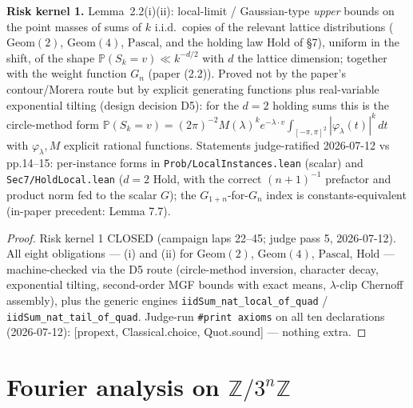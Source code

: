 \begin{lemma}\label{S3}
  \leanok
\textbf{Risk kernel 1.}  Lemma~2.2(i)(ii): local-limit / Gaussian-type \emph{upper} bounds on
the point masses of sums of \(k\) i.i.d.\ copies of the relevant lattice distributions
(\(\mathrm{Geom}(2)\), \(\mathrm{Geom}(4)\), \(\mathrm{Pascal}\), and the holding law
\(\mathrm{Hold}\) of §7), uniform in the shift, of the shape
\(\mathbb{P}(S_k = v)\ll k^{-d/2}\) with \(d\) the lattice dimension; together with the weight
function \(G_n\) (paper (2.2)).  Proved not by the paper's contour/Morera route but by explicit
generating functions plus real-variable exponential tilting (design decision D5): for the
\(d=2\) holding sums this is the circle-method form
\(\mathbb{P}(S_k=v)=(2\pi)^{-2}M(\lambda)^k e^{-\lambda\cdot v}\int_{[-\pi,\pi]^2}
|\varphi_\lambda(t)|^k\,dt\) with \(\varphi_\lambda,M\) explicit rational functions.
Statements judge-ratified 2026-07-12 vs pp.14--15: per-instance forms in
\texttt{Prob/LocalInstances.lean} (scalar) and \texttt{Sec7/HoldLocal.lean} (\(d=2\) Hold,
with the correct \((n+1)^{-1}\) prefactor and product norm fed to the scalar \(G\)); the
\(G_{1+n}\)-for-\(G_n\) index is constants-equivalent (in-paper precedent: Lemma 7.7).
\end{lemma}
\begin{proof}
  \leanok
Risk kernel 1 CLOSED (campaign laps 22--45; judge pass 5, 2026-07-12).  All eight
obligations --- (i) and (ii) for \(\mathrm{Geom}(2)\), \(\mathrm{Geom}(4)\),
\(\mathrm{Pascal}\), \(\mathrm{Hold}\) --- machine-checked via the D5 route (circle-method
inversion, character decay, exponential tilting, second-order MGF bounds with exact means,
\(\lambda\)-clip Chernoff assembly), plus the generic engines
\texttt{iidSum\_nat\_local\_of\_quad} / \texttt{iidSum\_nat\_tail\_of\_quad}.  Judge-run
\texttt{\#print axioms} on all ten declarations (2026-07-12):
[propext, Classical.choice, Quot.sound] --- nothing extra.
\end{proof}

\section{Fourier analysis on \(\mathbb{Z}/3^n\mathbb{Z}\)}

